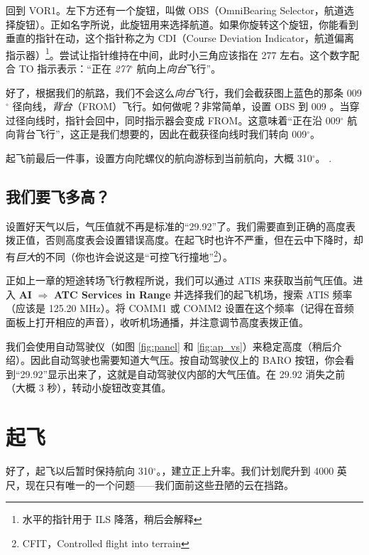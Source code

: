 回到 VOR1。左下方还有一个旋钮，叫做 OBS（OmniBearing Selector，航道选择旋钮）。正如名字所说，此旋钮用来选择航道。如果你旋转这个旋钮，你能看到垂直的指针在动，这个指针称之为 CDI（Course Deviation Indicator，航道偏离指示器）\footnote{水平的指针用于 ILS 降落，稍后会解释}。尝试让指针维持在中间，此时小三角应该指在 277 左右。这个数字配合 TO 指示表示：“正在 \emph{277$^\circ$} 航向上\emph{向台}飞行”。

好了，根据我们的航路，我们不会这么\emph{向台}飞行，我们会截获图上蓝色的那条 009$^\circ$ 径向线，\emph{背台}（FROM）飞行。如何做呢？非常简单，设置 OBS 到 009 。当穿过径向线时，指针会回中，同时指示器会变成 FROM。这意味着“正在沿 009$^\circ$ 航向背台飞行”，这正是我们想要的，因此在截获径向线时我们转向 009$^\circ$。

起飞前最后一件事，设置方向陀螺仪的航向游标到当前航向，大概 310$^\circ$。 .

\subsection{我们要飞多高？}

设置好天气以后，气压值就不再是标准的“29.92”了。我们需要直到正确的高度表拨正值，否则高度表会设置错误高度。在起飞时也许不严重，但在云中下降时，却有\emph{巨大}的不同（你也许会说这是“可控飞行撞地”\footnote{CFIT，Controlled flight into terrain}）。

正如上一章的短途转场飞行教程所说，我们可以通过 ATIS 来获取当前气压值。进入 \textbf{\textsf{AI}} $\Rightarrow$ \textbf{\textsf{ATC Services in Range}} 并选择我们的起飞机场，搜索 ATIS 频率（应该是 125.20 MHz）。将 COMM1 或 COMM2 设置在这个频率（记得在音频面板上打开相应的声音），收听机场通播，并注意调节高度表拨正值。

我们会使用自动驾驶仪（如图 \ref{fig:panel} 和 \ref{fig:ap_vs}）来稳定高度（稍后介绍）。因此自动驾驶也需要知道大气压。按自动驾驶仪上的 BARO 按钮，你会看到“29.92”显示出来了，这就是自动驾驶仪内部的大气压值。在 29.92 消失之前（大概 3 秒），转动小旋钮改变其值。

\section{起飞}

好了，起飞以后暂时保持航向 310$^\circ$。，建立正上升率。我们计划爬升到 4000 英尺，现在只有唯一的一个问题——我们面前这些丑陋的云在挡路。


